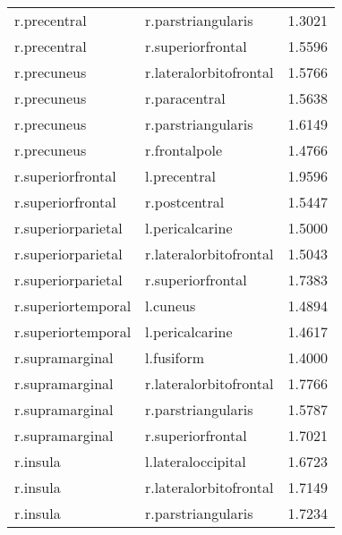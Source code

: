 \begin{table}
\begin{tabular}{llr}
r.precentral & r.parstriangularis & 1.3021 \\
r.precentral & r.superiorfrontal & 1.5596 \\
r.precuneus & r.lateralorbitofrontal & 1.5766 \\
r.precuneus & r.paracentral & 1.5638 \\
r.precuneus & r.parstriangularis & 1.6149 \\
r.precuneus & r.frontalpole & 1.4766 \\
r.superiorfrontal & l.precentral & 1.9596 \\
r.superiorfrontal & r.postcentral & 1.5447 \\
r.superiorparietal & l.pericalcarine & 1.5000 \\
r.superiorparietal & r.lateralorbitofrontal & 1.5043 \\
r.superiorparietal & r.superiorfrontal & 1.7383 \\
r.superiortemporal & l.cuneus & 1.4894 \\
r.superiortemporal & l.pericalcarine & 1.4617 \\
r.supramarginal & l.fusiform & 1.4000 \\
r.supramarginal & r.lateralorbitofrontal & 1.7766 \\
r.supramarginal & r.parstriangularis & 1.5787 \\
r.supramarginal & r.superiorfrontal & 1.7021 \\
r.insula & l.lateraloccipital & 1.6723 \\
r.insula & r.lateralorbitofrontal & 1.7149 \\
r.insula & r.parstriangularis & 1.7234 \\
\bottomrule
\end{tabular}
\end{table}
